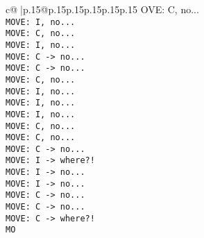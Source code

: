 \documentclass{article}
\begin{document}
{\begin{supertabular}{c@{$\;$}|p{.15\linewidth}@{}p{.15\linewidth}p{.15\linewidth}p{.15\linewidth}p{.15\linewidth}p{.15\linewidth}}
{{{OVE: C, no...\\ \tt  MOVE: I, no...\\ \tt  MOVE: C, no...\\ \tt  MOVE: I, no...\\ \tt  MOVE: C -> no...\\ \tt  MOVE: C -> no...\\ \tt  MOVE: C, no...\\ \tt  MOVE: I, no...\\ \tt  MOVE: I, no...\\ \tt  MOVE: I, no...\\ \tt  MOVE: C, no...\\ \tt  MOVE: C, no...\\ \tt  MOVE: C -> no...\\ \tt  MOVE: I -> where?!\\ \tt  MOVE: I -> no...\\ \tt  MOVE: I -> no...\\ \tt  MOVE: C -> no...\\ \tt  MOVE: C -> no...\\ \tt  MOVE: C -> where?!\\ \tt  MO}}}
\end{supertabular}}
\end{document}
